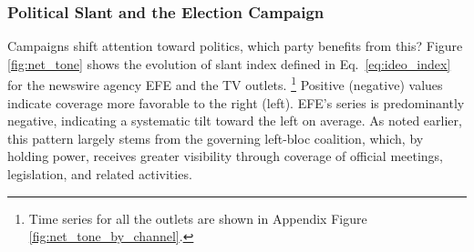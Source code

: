 \documentclass[12pt]{article}
\begin{document}
	
	
	
	
	

	
	
	
	

	
	\FloatBarrier
	
	
	\subsubsection*{Political Slant and the Election Campaign}
	
	
	Campaigns shift attention toward politics, which party benefits from this?   Figure \ref{fig:net_tone} shows the  evolution of slant index defined in Eq.~\eqref{eq:ideo_index}  for the newswire agency EFE and  the TV outlets. \footnote{Time series for all the outlets are shown in Appendix Figure \ref{fig:net_tone_by_channel}.} Positive (negative) values indicate coverage more favorable to the right (left).  EFE’s series is predominantly negative, indicating a systematic tilt toward the left on average. As noted earlier, this pattern largely stems from the governing left-bloc coalition, which, by holding power, receives greater visibility through coverage of official meetings, legislation, and related activities.
	
\end{document}
